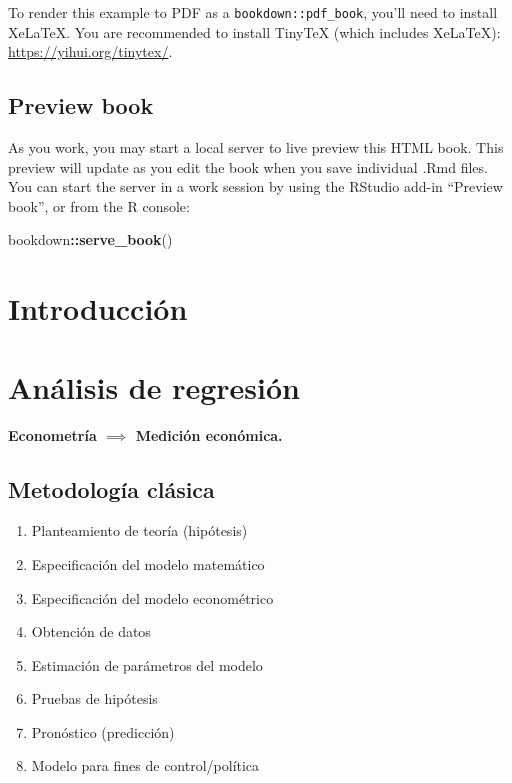 \documentclass[
]{book}
\newenvironment{Shaded}{\begin{snugshade}}{\end{snugshade}}
\newcommand{\FunctionTok}[1]{\textcolor[rgb]{0.13,0.29,0.53}{\textbf{#1}}}
\newcommand{\NormalTok}[1]{#1}
\newcommand{\SpecialCharTok}[1]{\textcolor[rgb]{0.81,0.36,0.00}{\textbf{#1}}}
\providecommand{\tightlist}{%
  \setlength{\itemsep}{0pt}\setlength{\parskip}{0pt}}
\begin{document}
To render this example to PDF as a \texttt{bookdown::pdf\_book}, you'll need to install XeLaTeX. You are recommended to install TinyTeX (which includes XeLaTeX): \url{https://yihui.org/tinytex/}.

\hypertarget{preview-book}{%
\section{Preview book}\label{preview-book}}

As you work, you may start a local server to live preview this HTML book. This preview will update as you edit the book when you save individual .Rmd files. You can start the server in a work session by using the RStudio add-in ``Preview book'', or from the R console:

\begin{Shaded}
\begin{Highlighting}[]
\NormalTok{bookdown}\SpecialCharTok{::}\FunctionTok{serve\_book}\NormalTok{()}
\end{Highlighting}
\end{Shaded}

\hypertarget{introducciuxf3n}{%
\chapter{Introducción}\label{introducciuxf3n}}

\hypertarget{anuxe1lisis-de-regresiuxf3n}{%
\chapter{Análisis de regresión}\label{anuxe1lisis-de-regresiuxf3n}}

\textbf{Econometría \(\implies\) Medición económica.}

\hypertarget{metodologuxeda-cluxe1sica}{%
\section{Metodología clásica}\label{metodologuxeda-cluxe1sica}}

\begin{enumerate}
\def\labelenumi{\arabic{enumi}.}
\tightlist
\item
  Planteamiento de teoría (hipótesis)\\
\item
  Especificación del modelo matemático\\
\item
  Especificación del modelo econométrico\\
\item
  Obtención de datos\\
\item
  Estimación de parámetros del modelo\\
\item
  Pruebas de hipótesis\\
\item
  Pronóstico (predicción)\\
\item
  Modelo para fines de control/política
\end{enumerate}
\end{document}
